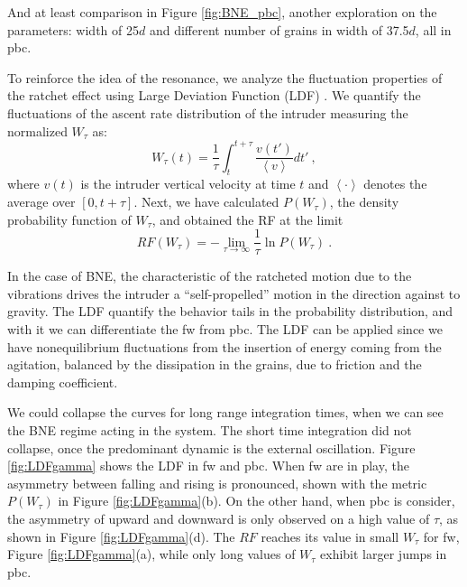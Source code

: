     And at least comparison in Figure \ref{fig:BNE_pbc}, another exploration on the parameters: width of 25$d$ and different number of grains in width of 37.5$d$, all in pbc.

    To reinforce the idea of the resonance, we analyze the fluctuation properties of the ratchet effect using Large Deviation Function (LDF) \cite{Symmetry_properties_of_the_large-deviation_function_of_the_velocity_of_a_self-propelled_polar_particle, Large_Deviations_in_Physics}. We quantify the fluctuations of the ascent rate distribution of the intruder measuring the normalized  $W_{\tau}$ as:
%
\begin{equation}
    W_{\tau}(t) = \frac{1}{\tau} \int_t^{t+\tau} \frac{v(t')}{\left<v\right>} dt'~, 
\end{equation}
%
where $v(t)$ is the intruder vertical velocity at time $t$ and $\left< \cdot \right>$ denotes the average over $[0,t+\tau]$. Next, we have calculated $P(W_{\tau})$, the density probability function of $W_\tau$, and obtained the RF at the limit
%
\begin{equation}
    RF(W_\tau) = -\lim_{\tau \rightarrow \infty} \frac{1}{\tau} \ln P(W_\tau)~.
\end{equation}

    In the case of BNE, the characteristic of the ratcheted motion due to the vibrations drives the intruder a ``self-propelled'' motion in the direction against to gravity. The LDF quantify the behavior tails in the probability distribution, and with it we can differentiate the fw from pbc. The LDF can be applied since we have nonequilibrium fluctuations from the insertion of energy coming from the agitation, balanced by the dissipation in the grains, due to friction and the damping coefficient.

    We could collapse the curves for long range integration times, when we can see the BNE regime acting in the system. The short time integration did not collapse, once the predominant dynamic is the external oscillation. Figure \ref{fig:LDFgamma} shows the LDF in fw and pbc. When fw are in play, the asymmetry between falling and rising is pronounced, shown with the metric $P(W_{\tau})$ in Figure \ref{fig:LDFgamma}(b). On the other hand, when pbc is consider, the asymmetry of upward and downward is only observed on a high value of $\tau$, as shown in Figure \ref{fig:LDFgamma}(d). The $RF$ reaches its value in small $W_{\tau}$ for fw, Figure \ref{fig:LDFgamma}(a), while only long values of $W_{\tau}$ exhibit larger jumps in pbc.


